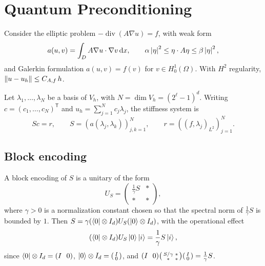 \chapter{Quantum Preconditioning}\label{ch:sec07}

Consider the elliptic problem $-\operatorname{div}(A\nabla u) = f$, with weak form
\begin{equation}
  a(u, v) = \int_D A\nabla u \cdot \nabla v\,\mathrm{d} x, \qquad
  \alpha\left\lvert \eta \right\rvert^2 \le \eta \cdot A\eta \le \beta\left\lvert \eta \right\rvert^2,
\end{equation}
and Galerkin formulation $a(u, v) = f(v)$ for $v \in H_0^1(\Omega)$. With
$H^2$ regularity, $\left\lVert u - u_h \right\rVert \le C_{A, f}\, h$.

Let $\lambda_1, \dots, \lambda_N$ be a basis of $V_h$, with
$N = \dim V_h = (2^\ell - 1)^d$. Writing $c = (c_1, \dots, c_N)^{\mathsf{T}}$ and
$u_h = \sum_{j=1}^N c_j \lambda_j$, the stiffness system is
\begin{equation}
  S c = r, \qquad S = (a(\lambda_j, \lambda_k))_{j,k=1}^N, \qquad
  r = ((f, \lambda_j)_{L^2})_{j=1}^N.
\end{equation}

\section{Block encoding}\label{sec:sec07-block}

A block encoding of $S$ is a unitary of the form
\begin{equation}
  U_S = \begin{pmatrix} \tfrac{1}{\gamma} S & * \\ * & * \end{pmatrix},
\end{equation}
where $\gamma > 0$ is a normalization constant chosen so that the spectral norm of
$\tfrac{1}{\gamma}S$ is bounded by $1$. Then
$S = \gamma(\bra{0} \otimes I_d) U_S (\ket{0} \otimes I_d)$, with the operational
effect
\begin{equation}
  (\bra{0} \otimes I_d) U_S \ket{0}\ket{i} = \frac{1}{\gamma} S\ket{i},
\end{equation}
since $\bra{0} \otimes I_d = (I\ \ 0)$, $\ket{0} \otimes I_d = \begin{psmallmatrix} I \\ 0 \end{psmallmatrix}$, and
$(I\ \ 0)\begin{psmallmatrix} S/\gamma & * \\ * & * \end{psmallmatrix}\begin{psmallmatrix} I \\ 0 \end{psmallmatrix} = \tfrac{1}{\gamma}S$.

